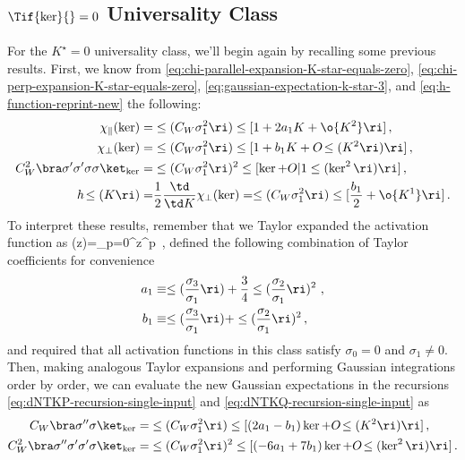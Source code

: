 \subsection{\texorpdfstring{$\Tif{\ker}{}=0$}{K*=0} Universality Class}\label{subsec:dntk_criticality_tanh_univ}
For the $K^\star=0$ universality class, we'll begin again by recalling some previous results. First, we know from
\eqref{eq:chi-parallel-expansion-K-star-equals-zero}, \eqref{eq:chi-perp-expansion-K-star-equals-zero}, \eqref{eq:gaussian-expectation-k-star-3}, and \eqref{eq:h-function-reprint-new} the following:
\begin{align}\label{eq:recalling-expansion-for-the-sake-of-dntk-for-one-last-time-1}
\chi_{\parallel}(\ker)=&\le(C_W\sigma_1^2\ri)\le[1+2 a_1K+\o{K^2}\ri]\, ,\\
\label{eq:recalling-expansion-for-the-sake-of-dntk-for-one-last-time-2}
\chi_{\perp}(\ker)=&\le(C_W\sigma_1^2\ri)\le[1+b_1 K+O\!\le(K^2\ri)\ri]\, ,\\
\label{eq:recalling-expansion-for-the-sake-of-dntk-for-one-last-time-3}
C_W^2\bra\sigma^{\prime}\sigma^{\prime}\sigma\sigma\ket_{\ker}=&\le(C_W\sigma_1^2\ri)^2\le[\ker+O|1\le(\ker^2\ri)\ri]\,  ,\\
\label{eq:recalling-expansion-for-the-sake-of-dntk-for-one-last-time-4}
h\!\le(K\ri)=&\frac{1}{2}\frac{\td }{\td K}\chi_{\perp}(\ker)=\le(C_W\sigma_1^2\ri)\le[\frac{b_1}{2}+\o{K^1}\ri]\, .
\end{align}
To interpret these results, remember that we Taylor expanded the activation function as %
\be\label{eq:taylor-expansion-k-star-reprint-last}
\sigma(z)=\sum_{p=0}^{\infty}z^p\,  ,
\ee
 defined the following combination of Taylor coefficients for convenience
\begin{align}
a_1&\equiv \le(\frac{\sigma_3}{\sigma_1}\ri)+\frac{3}{4}\le(\frac{\sigma_2}{\sigma_1}\ri)^2\ ,\label{eq:a1-recall-last}\\
b_1&\equiv \le(\frac{\sigma_3}{\sigma_1}\ri)+\le(\frac{\sigma_2}{\sigma_1}\ri)^2\, ,\label{eq:b1-recall-last}%
\end{align}
and required that all activation functions in this class satisfy $\sigma_0 = 0$ and $\sigma_1 \neq 0$.
Then, making analogous Taylor expansions and performing Gaussian integrations order by order, we can evaluate the new Gaussian expectations in  the recursions \eqref{eq:dNTKP-recursion-single-input} and \eqref{eq:dNTKQ-recursion-single-input} as
\begin{align}
C_W\bra\sigma^{\prime\prime}\sigma\ket_{\ker}=&\le(C_W\sigma_1^2\ri)\le[(2a_1-b_1)\ker+O\!\le(K^2\ri)\ri]\, ,\label{eq:doing-expansion-for-the-sake-of-dntk-for-one-last-time-3}\\
C_W^2\bra\sigma^{\prime\prime}\sigma^{\prime}\sigma^{\prime}\sigma\ket_{\ker}=&\le(C_W\sigma_1^2\ri)^2\le[(-6a_1+7b_1)\ker+O\!\le(\ker^2\ri)\ri]\, .\label{eq:doing-expansion-for-the-sake-of-dntk-for-one-last-time-4}
\end{align}





